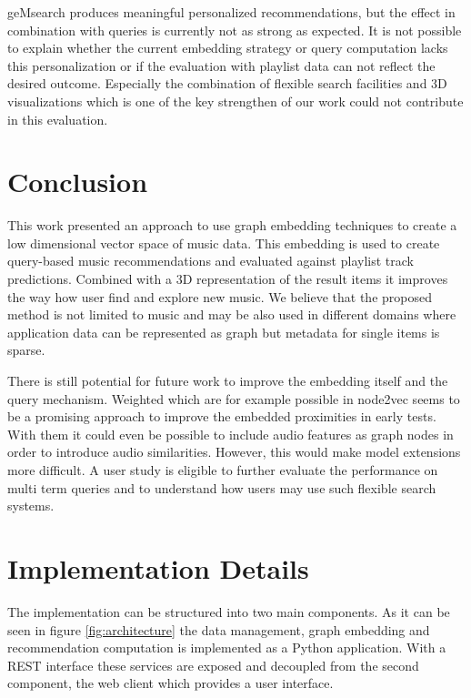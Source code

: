 \documentclass[sigconf]{acmart}
\begin{document}
geMsearch produces meaningful personalized recommendations, but the effect in combination with queries is currently not as strong as expected. It is not possible to explain whether the current embedding strategy or query computation lacks this personalization or if the evaluation with playlist data can not reflect the desired outcome. Especially the combination of flexible search facilities and 3D visualizations which is one of the key strengthen of our work could not contribute in this evaluation.


\section{Conclusion}
\label{sec:conclusion}
This work presented an approach to use graph embedding techniques to create a low dimensional vector space of music data. This embedding is used to create query-based music recommendations and evaluated against playlist track predictions. Combined with a 3D representation of the result items it improves the way how user find and explore new music. 
We believe that the proposed method is not limited to music and may be also used in different domains where application data can be represented as graph but metadata for single items is sparse.

There is still potential for future work to improve the embedding itself and the query mechanism. Weighted which are for example possible in node2vec\cite{grover2016node2vec} seems to be a promising approach to improve the embedded proximities in early tests. With them it could even be possible to include audio features as graph nodes in order to introduce audio similarities. However, this would make model extensions more difficult. A user study is eligible to further evaluate the performance on multi term queries and to understand how users may use such flexible search systems.





\cleardoublepage
\appendix
\section{Implementation Details}

The implementation can be structured into two main components. As it can be seen in figure \ref{fig:architecture} the data management, graph embedding and recommendation computation is implemented as a Python application. With a REST interface these services are exposed and decoupled from the second component, the web client which provides a user interface.
\end{document}
